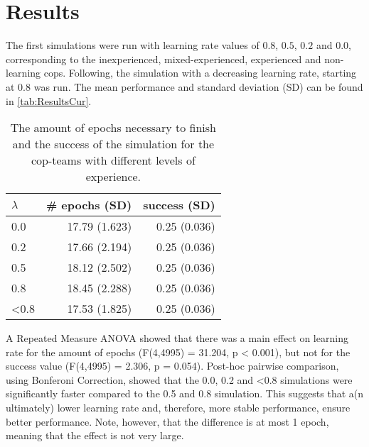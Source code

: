\section{Results}

The first simulations were run with learning rate values of $0.8$, $0.5$, $0.2$ and $0.0$, corresponding to the inexperienced, mixed-experienced, experienced and non-learning cops. Following, the simulation with a decreasing learning rate, starting at $0.8$ was run. The mean performance and standard deviation (SD) can be found in \autoref{tab:ResultsCur}. 

\begin{table}[!ht]
\begin{center}
\begin{tabular}{l r  r}
$\lambda$ &  \# epochs (SD) & success (SD)\\
\hline
0.0 & 17.79 (1.623) & 0.25 (0.036) \\
0.2 & 17.66 (2.194) & 0.25 (0.036) \\
0.5 & 18.12 (2.502) & 0.25 (0.036) \\
0.8 & 18.45 (2.288) & 0.25 (0.036) \\
<0.8 & 17.53 (1.825) & 0.25 (0.036) \\
\hline
\end{tabular}
\caption{The amount of epochs necessary to finish and the success of the simulation for the cop-teams with different levels of experience. }
\label{tab:ResultsCur}
\end{center}
\end{table}

A Repeated Measure ANOVA showed that there was a main effect on learning rate for the amount of epochs (F(4,4995) = 31.204, p < 0.001), but not for the success value (F(4,4995) = 2.306, p = 0.054). Post-hoc pairwise comparison, using Bonferoni Correction, showed that the 0.0, 0.2 and <0.8 simulations were significantly faster compared to the 0.5 and 0.8 simulation. This suggests that a(n ultimately) lower learning rate and, therefore, more stable performance, ensure better performance. Note, however, that the difference is at most 1 epoch, meaning that the effect is not very large. 

